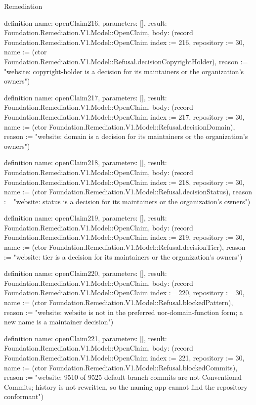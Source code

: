 \begin{lexlean}{Remediation}
\begin{semanticmodule}
definition{
  name: openClaim216,
  parameters: [],
  result: Foundation.Remediation.V1.Model::OpenClaim,
  body: (record Foundation.Remediation.V1.Model::OpenClaim {index := 216, repository := 30, name := (ctor Foundation.Remediation.V1.Model::Refusal.decisionCopyrightHolder), reason := "website: copyright-holder is a decision for its maintainers or the organization's owners"})
}

definition{
  name: openClaim217,
  parameters: [],
  result: Foundation.Remediation.V1.Model::OpenClaim,
  body: (record Foundation.Remediation.V1.Model::OpenClaim {index := 217, repository := 30, name := (ctor Foundation.Remediation.V1.Model::Refusal.decisionDomain), reason := "website: domain is a decision for its maintainers or the organization's owners"})
}

definition{
  name: openClaim218,
  parameters: [],
  result: Foundation.Remediation.V1.Model::OpenClaim,
  body: (record Foundation.Remediation.V1.Model::OpenClaim {index := 218, repository := 30, name := (ctor Foundation.Remediation.V1.Model::Refusal.decisionStatus), reason := "website: status is a decision for its maintainers or the organization's owners"})
}

definition{
  name: openClaim219,
  parameters: [],
  result: Foundation.Remediation.V1.Model::OpenClaim,
  body: (record Foundation.Remediation.V1.Model::OpenClaim {index := 219, repository := 30, name := (ctor Foundation.Remediation.V1.Model::Refusal.decisionTier), reason := "website: tier is a decision for its maintainers or the organization's owners"})
}

definition{
  name: openClaim220,
  parameters: [],
  result: Foundation.Remediation.V1.Model::OpenClaim,
  body: (record Foundation.Remediation.V1.Model::OpenClaim {index := 220, repository := 30, name := (ctor Foundation.Remediation.V1.Model::Refusal.blockedPattern), reason := "website: website is not in the preferred uor-{domain}-{function} form; a new name is a maintainer decision"})
}

definition{
  name: openClaim221,
  parameters: [],
  result: Foundation.Remediation.V1.Model::OpenClaim,
  body: (record Foundation.Remediation.V1.Model::OpenClaim {index := 221, repository := 30, name := (ctor Foundation.Remediation.V1.Model::Refusal.blockedCommits), reason := "website: 9510 of 9525 default-branch commits are not Conventional Commits; history is not rewritten, so the naming app cannot find the repository conformant"})
}


\end{semanticmodule}
\end{lexlean}
